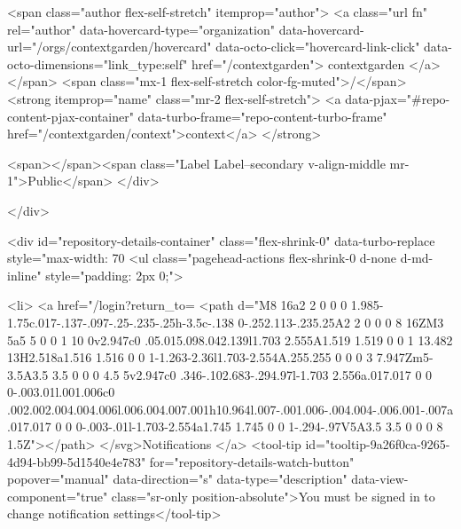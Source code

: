     <span class="author flex-self-stretch" itemprop="author">
      <a class="url fn" rel="author" data-hovercard-type="organization" data-hovercard-url="/orgs/contextgarden/hovercard" data-octo-click="hovercard-link-click" data-octo-dimensions="link_type:self" href="/contextgarden">
        contextgarden
</a>    </span>
    <span class="mx-1 flex-self-stretch color-fg-muted">/</span>
    <strong itemprop="name" class="mr-2 flex-self-stretch">
      <a data-pjax="#repo-content-pjax-container" data-turbo-frame="repo-content-turbo-frame" href="/contextgarden/context">context</a>
    </strong>

    <span></span><span class="Label Label--secondary v-align-middle mr-1">Public</span>
  </div>


        </div>

        <div id="repository-details-container" class="flex-shrink-0" data-turbo-replace style="max-width: 70%
            <ul class="pagehead-actions flex-shrink-0 d-none d-md-inline" style="padding: 2px 0;">
    
      

  <li>
            <a href="/login?return_to=%
    <path d="M8 16a2 2 0 0 0 1.985-1.75c.017-.137-.097-.25-.235-.25h-3.5c-.138 0-.252.113-.235.25A2 2 0 0 0 8 16ZM3 5a5 5 0 0 1 10 0v2.947c0 .05.015.098.042.139l1.703 2.555A1.519 1.519 0 0 1 13.482 13H2.518a1.516 1.516 0 0 1-1.263-2.36l1.703-2.554A.255.255 0 0 0 3 7.947Zm5-3.5A3.5 3.5 0 0 0 4.5 5v2.947c0 .346-.102.683-.294.97l-1.703 2.556a.017.017 0 0 0-.003.01l.001.006c0 .002.002.004.004.006l.006.004.007.001h10.964l.007-.001.006-.004.004-.006.001-.007a.017.017 0 0 0-.003-.01l-1.703-2.554a1.745 1.745 0 0 1-.294-.97V5A3.5 3.5 0 0 0 8 1.5Z"></path>
</svg>Notifications
</a>    <tool-tip id="tooltip-9a26f0ca-9265-4d94-bb99-5d1540e4e783" for="repository-details-watch-button" popover="manual" data-direction="s" data-type="description" data-view-component="true" class="sr-only position-absolute">You must be signed in to change notification settings</tool-tip>

